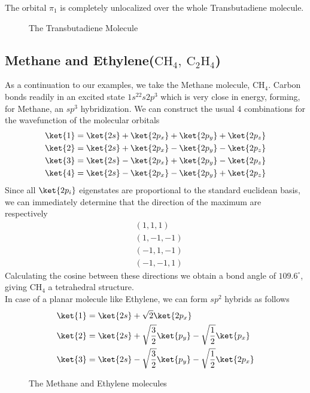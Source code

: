 \documentclass[a4paper, 11pt]{book}
\newcommand{\1}{\opr{\mathds{1}}}
\theoremstyle{plain}
\begin{document}
	The orbital $\pi_1$ is completely unlocalized over the whole Transbutadiene molecule.
	\begin{figure}[H]
		\centering
		\caption{The Transbutadiene Molecule}
		\label{fig:transbutadiene}
	\end{figure}
	\subsection{Methane and Ethylene($\mathrm{CH_4,\ C_2H_4}$)}
	As a continuation to our examples, we take the Methane molecule, $\mathrm{CH_4}$. Carbon bonds readily in an excited state $1s^22s2p^3$ which is very close in energy, forming, for Methane, an $sp^3$ hybridization. We can construct the usual 4 combinations for the wavefunction of the molecular orbitals
	\begin{equation}
		\begin{aligned}
			\ket{1}&=\ket{2s}+\ket{2p_x}+\ket{2p_y}+\ket{2p_z}\\
			\ket{2}&=\ket{2s}+\ket{2p_x}-\ket{2p_y}-\ket{2p_z}\\
			\ket{3}&=\ket{2s}-\ket{2p_x}+\ket{2p_y}-\ket{2p_z}\\
			\ket{4}&=\ket{2s}-\ket{2p_x}-\ket{2p_y}+\ket{2p_z}
		\end{aligned}
		\label{eq:methanewavefunctions}
	\end{equation}
	Since all $\ket{2p_i}$ eigenstates are proportional to the standard euclidean basis, we can immediately determine that the direction of the maximum are respectively
	\begin{equation*}
		\begin{aligned}
			&(1,1,1)\\
			&(1,-1,-1)\\
			&(-1,1,-1)\\
			&(-1,-1,1)
		\end{aligned}
	\end{equation*}
	Calculating the cosine between these directions we obtain a bond angle of $109.6^{\circ}$, giving $\mathrm{CH_4}$ a tetrahedral structure.\\
	In case of a planar molecule like Ethylene, we can form $sp^2$ hybrids as follows
	\begin{equation}
		\begin{aligned}
			\ket{1}&=\ket{2s}+\sqrt{2}\ket{2p_x}\\
			\ket{2}&=\ket{2s}+\sqrt{\frac{3}{2}}\ket{p_y}-\sqrt{\frac{1}{2}}\ket{p_x}\\
			\ket{3}&=\ket{2s}-\sqrt{\frac{3}{2}}\ket{p_y}-\sqrt{\frac{1}{2}}\ket{2p_x}
		\end{aligned}
		\label{eq:ethylene}
	\end{equation}
	\begin{figure}[H]
		\centering
		\qquad\qquad{}
		\label{fig:methaneethylene}
		\caption{The Methane and Ethylene molecules}
	\end{figure}
\end{document}
